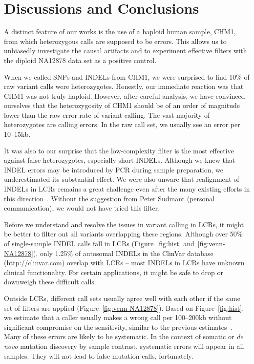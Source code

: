 \documentclass{bioinfo}
\begin{document}
\section{Discussions and Conclusions}
A distinct feature of our works is the use of a haploid human sample, CHM1,
from which heterozygous calls are supposed to be errors. This allows us to unbiasedly
investigate the causal artifacts and to experiment effective filters with the
diploid NA12878 data set as a positive control.

When we called SNPs and INDELs from CHM1, we were surprised to find 10\% of raw
variant calls were heterozygotes. Honestly, our immediate reaction was that
CHM1 was not truly haploid. However, after careful analysis, we have convinced
ourselves that the heterozygosity of CHM1 should be of an order of magnitude
lower than the raw error rate of variant calling. The vast majority of
heterozygotes are calling errors. In the raw call set, we usually see an error
per 10--15kb.

It was also to our surprise that the low-complexity filter is the most
effective against false heterozygotes, especially short INDELs. Although we
knew that INDEL errors may be introduced by PCR during sample preparation, we
underestimated its substantial effect. We were also unware that realignment of
INDELs in LCRs remains a great challenge even after the many existing
efforts in this
direction~\citep{Homer:2010aa,Li:2011kx,Albers:2011aa,Narzisi:2014aa}. Without
the suggestion from Peter Sudmant (personal communication), we would not have
tried this
filter.

Before we understand and resolve the issues in variant calling in LCRs,
it might be better to filter out all variants overlapping these regions.
Although over 50\% of single-sample INDEL calls fall in LCRs
(Figure~\ref{fig:hist} and~\ref{fig:venn-NA12878}), only 1.25\% of autosomal
INDELs in the ClinVar database (http://clinvar.com) overlap with LCRs -- most
INDELs in LCRs have unknown clinical functionality. For certain applications, it might be safe to drop or downweigh
these difficult calls.

Outside LCRs, different call sets usually agree well with each other
if the same set of filters are applied (Figure~\ref{fig:venn-NA12878}). Based
on Figure~\ref{fig:hist}, we estimate that a caller usually makes a wrong call
per 100--200kb without significant compromise on the sensitivity, similar to
the previous estimates~\citep{Bentley:2008cr,Nickles:2012aa}. Many of these
errors are likely to be systematic. In the context of somatic or \emph{de novo}
mutation discovery by sample contrast, systematic errors will appear in all
samples.  They will not lead to false mutation calls, fortunately.
\end{document}
